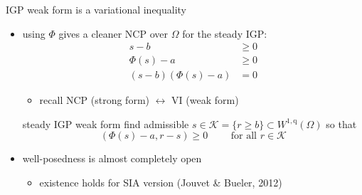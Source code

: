 \documentclass[usepdftitle=false,usenames,dvipsnames]{beamer}
\newcommand{\ip}[2]{\left(#1,#2\right)}
\newcommand{\qq}{{\text{q}}}
\begin{document}
\begin{frame}{IGP weak form is a variational inequality}

\begin{itemize}
\item using $\Phi$ gives a cleaner NCP over $\Omega$ for the steady IGP:
\begin{align*}
s - b &\ge 0 \\
\Phi(s) - a &\ge 0 \\
(s - b) (\Phi(s) - a) &= 0
\end{align*}

    \begin{itemize}
    \item recall NCP (strong form) $\leftrightarrow$ VI (weak form)
    \end{itemize}

\begin{block}{steady IGP weak form}
find admissible $s \in \mathcal{K} = \{r \ge b\} \subset W^{1,\qq}(\Omega)$ so that
    $$\ip{\Phi(s)-a}{r-s} \ge 0 \qquad \text{ for all } r \in \mathcal{K}$$
\end{block}

\item well-posedness is almost completely open
    \begin{itemize}
    \item existence holds for SIA version (Jouvet \& Bueler, 2012)
    \end{itemize}

\end{itemize}
\end{frame}
\end{document}
